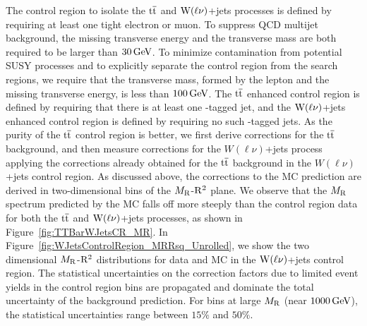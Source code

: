 The control region to isolate the $\mathrm{t}\overline{\mathrm{t}}$ and $\mathrm{W}(\ell\nu)$+jets processes is defined by requiring 
at least one tight electron or muon. To suppress QCD multijet background, the missing transverse 
energy and the transverse mass are both required to be larger than $30 \,\text{Ge\hspace{-.08em}V}$. To minimize 
contamination from potential SUSY processes and to explicitly separate the control region
from the search regions, we require that the transverse mass, formed
by the lepton and the missing transverse energy, is less than 
$100 \,\text{Ge\hspace{-.08em}V}$. The $\mathrm{t}\overline{\mathrm{t}}$ enhanced control region is defined by requiring that there is at 
least one \PQb-tagged jet, and the $\mathrm{W}(\ell\nu)$+jets enhanced control region is defined by
requiring no such \PQb-tagged jets. As the purity of the $\mathrm{t}\overline{\mathrm{t}}$ control region is
better, we first derive corrections for the $\mathrm{t}\overline{\mathrm{t}}$ background, and then measure
corrections for the $W(\ell\nu)$+jets process applying the corrections already obtained
for the $\mathrm{t}\overline{\mathrm{t}}$ background in the $W(\ell\nu)$+jets control region.
As discussed above, the corrections to the MC prediction are derived in two-dimensional bins of the
$M_\mathrm{R}$-$\mathrm{R}^2$ plane. We observe that the $M_\mathrm{R}$ spectrum predicted by the MC
falls off more steeply than the control region data for both the $\mathrm{t}\overline{\mathrm{t}}$ and $\mathrm{W}(\ell\nu)$+jets
processes, as shown in Figure~\ref{fig:TTBarWJetsCR_MR}. In 
Figure~\ref{fig:WJetsControlRegion_MRRsq_Unrolled}, we show the two dimensional $M_\mathrm{R}$-$\mathrm{R}^2$ distributions
for data and MC in the $\mathrm{W}(\ell\nu)$+jets control region. The statistical uncertainties on the correction factors
due to limited event yields in the control region bins are propagated and dominate the total uncertainty 
of the background prediction. For bins at large $M_\mathrm{R}$ (near $1000\,\text{Ge\hspace{-.08em}V}$), the statistical uncertainties 
range between $15\%$ and $50\%$. 

